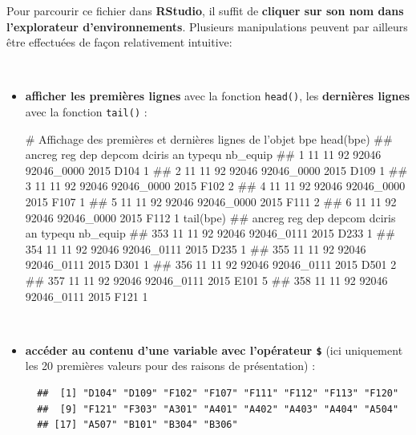 \documentclass[12pt,twosided, notitlepage]{book}
\newenvironment{Shaded}{}{}
\newcommand{\KeywordTok}[1]{\textcolor[rgb]{0.00,0.00,1.00}{{#1}}}
\newcommand{\CommentTok}[1]{\textcolor[rgb]{0.00,0.50,0.00}{{#1}}}
\newcommand{\NormalTok}[1]{{#1}}
\renewenvironment{Shaded}{\begin{snugshade}}{\end{snugshade}}
\begin{document}
Pour parcourir ce fichier dans \textbf{RStudio}, il suffit de
\textbf{cliquer sur son nom dans l'explorateur d'environnements}.
Plusieurs manipulations peuvent par ailleurs être effectuées de façon
relativement intuitive:

~

\begin{itemize}
\item
  \textbf{afficher les premières lignes} avec la fonction
  \texttt{head()}, les \textbf{dernières lignes} avec la fonction
  \texttt{tail()} :

\begin{Shaded}
\begin{Highlighting}[]
\CommentTok{# Affichage des premières et dernières lignes de l'objet bpe}
\KeywordTok{head}\NormalTok{(bpe)}
  \NormalTok{##   ancreg reg dep depcom     dciris   an typequ nb_equip}
  \NormalTok{## 1     11  11  92  92046 92046_0000 2015   D104        1}
  \NormalTok{## 2     11  11  92  92046 92046_0000 2015   D109        1}
  \NormalTok{## 3     11  11  92  92046 92046_0000 2015   F102        2}
  \NormalTok{## 4     11  11  92  92046 92046_0000 2015   F107        1}
  \NormalTok{## 5     11  11  92  92046 92046_0000 2015   F111        2}
  \NormalTok{## 6     11  11  92  92046 92046_0000 2015   F112        1}
\KeywordTok{tail}\NormalTok{(bpe)}
  \NormalTok{##     ancreg reg dep depcom     dciris   an typequ nb_equip}
  \NormalTok{## 353     11  11  92  92046 92046_0111 2015   D233        1}
  \NormalTok{## 354     11  11  92  92046 92046_0111 2015   D235        1}
  \NormalTok{## 355     11  11  92  92046 92046_0111 2015   D301        1}
  \NormalTok{## 356     11  11  92  92046 92046_0111 2015   D501        2}
  \NormalTok{## 357     11  11  92  92046 92046_0111 2015   E101        5}
  \NormalTok{## 358     11  11  92  92046 92046_0111 2015   F121        1}
\end{Highlighting}
\end{Shaded}
\end{itemize}

~

\begin{itemize}
\item
  \textbf{accéder au contenu d'une variable avec l'opérateur
  \texttt{\$}}\index{\texttt{\$}} (ici uniquement les 20 premières
  valeurs pour des raisons de présentation) :

\begin{Shaded}
\end{Shaded}

\begin{verbatim}
  ##  [1] "D104" "D109" "F102" "F107" "F111" "F112" "F113" "F120"
  ##  [9] "F121" "F303" "A301" "A401" "A402" "A403" "A404" "A504"
  ## [17] "A507" "B101" "B304" "B306"
\end{verbatim}
\end{itemize}
\end{document}
